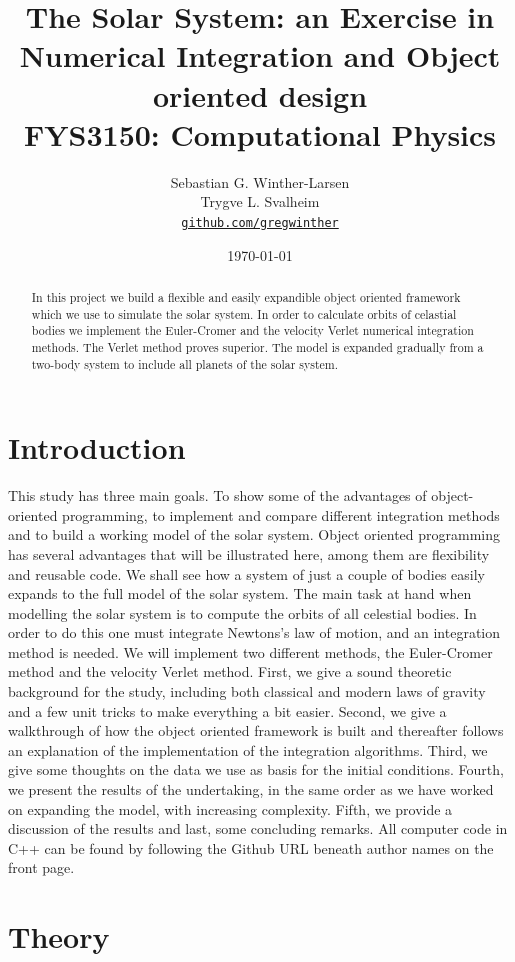 \documentclass[10pt,a4paper]{amsart}
\title[Simulation of the Solar System]{The Solar System: an Exercise in Numerical Integration and Object oriented design \\
  \hrulefill\small{ FYS3150: Computational Physics }\hrulefill}
\author[Winther-Larsen \& Svalheim]{Sebastian G. Winther-Larsen \\ 
Trygve L. Svalheim \\
\href{https://github.com/gregwinther/FYS3150/}{\texttt{github.com/gregwinther}}}
\date{\today}
\begin{document}
\begin{titlepage}
\begin{abstract}
In this project we build a flexible and easily expandible object oriented framework which we use to simulate the solar system. In order to calculate orbits of celastial bodies we implement the Euler-Cromer and the velocity Verlet numerical integration methods. The Verlet method proves superior. The model is expanded gradually from a two-body system to include all planets of the solar system.
\end{abstract}
\maketitle
\tableofcontents
\end{titlepage}

\section{Introduction}

This study has three main goals. To show some of the advantages of object-oriented programming, to implement and compare different integration methods and to build a working model of the solar system. Object oriented programming has several advantages that will be illustrated here, among them are flexibility and reusable code. We shall see how a system of just a couple of bodies easily expands to the full model of the solar system. The main task at hand when modelling the solar system is to compute the orbits of all celestial bodies. In order to do this one must integrate Newtons's law of motion, and an integration method is needed. We will implement two different methods, the Euler-Cromer method and the velocity Verlet method.
First, we give a sound theoretic background for the study, including both classical and modern laws of gravity and a few unit tricks to make everything a bit easier. Second, we give a walkthrough of how the object oriented framework is built and thereafter follows an explanation of the implementation of the integration algorithms. Third, we give some thoughts on the data we use as basis for the initial conditions. Fourth, we present the results of the undertaking, in the same order as we have worked on expanding the model, with increasing complexity. Fifth, we provide a discussion of the results and last, some concluding remarks. All computer code in C++ can be found by following the Github URL beneath author names on the front page.

\section{Theory}
\end{document}
